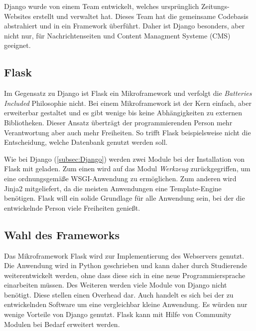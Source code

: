 Django wurde von einem Team entwickelt, welches ursprünglich Zeitungs-Websites erstellt und verwaltet hat. Dieses Team hat die gemeinsame Codebasis abstrahiert und in ein Framework überführt. Daher ist Django besonders, aber nicht nur, für Nachrichtenseiten und Content Managment Systeme (CMS) geeignet. \cite{mdncontributorsDjangoIntroduction2019}

\subsection{Flask}
Im Gegensatz zu Django ist Flask ein Mikroframework und verfolgt die \textit{Batteries Included} Philosophie nicht. Bei einem Mikroframework ist der Kern einfach, aber erweiterbar gestaltet und es gibt wenige bis keine Abhängigkeiten zu externen Bibliotheken. Dieser Ansatz überträgt der programmierenden Person mehr Verantwortung aber auch mehr Freiheiten. So trifft Flask beispielsweise nicht die Entscheidung, welche Datenbank genutzt werden soll. \cite{palletsForewordFlaskDocumentation2010} 

Wie bei Django (\ref{subsec:Django}) werden zwei Module bei der Installation von Flask mit geladen. Zum einen wird auf das Modul \textit{Werkzeug} zurückgegriffen, um eine ordnungsgemäße WSGI-Anwendung zu ermöglichen. Zum anderen wird Jinja2 mitgeliefert, da die meisten Anwendungen eine Template-Engine benötigen.
Flask will ein solide Grundlage für alle Anwendung sein, bei der die entwickelnde Person viele Freiheiten genießt.\cite{palletsDesignDecisionsFlask2010}

\subsection{Wahl des Frameworks}

Das Mikroframework Flask wird zur Implementierung des Webservers genutzt. Die Anwendung wird in Python geschrieben und kann daher durch Studierende weiterentwickelt werden, ohne dass diese sich in eine neue Programmiersprache einarbeiten müssen. Des Weiteren werden viele Module von Django nicht benötigt. Diese stellen einen Overhead dar. Auch handelt es sich bei der zu entwickelnden Software um eine vergleichbar kleine Anwendung. Es würden nur wenige Vorteile von Django genutzt. Flask kann mit Hilfe von Community Modulen bei Bedarf erweitert werden.